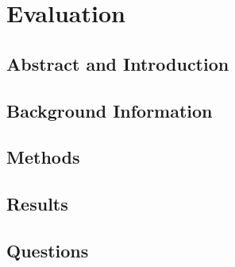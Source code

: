 






\maketitle
\abstract{} \label{sec:abstract}
\thispagestyle{fancy} %


\section{Evaluation} \label{sec:evaluation}


\subsection{Abstract and Introduction} \label{sub:introduction}


\subsection{Background Information} \label{sub:background}


\subsection{Methods} \label{sub:methods}


\subsection{Results} \label{sub:results}


\subsection{Questions} \label{sub:questions1}


